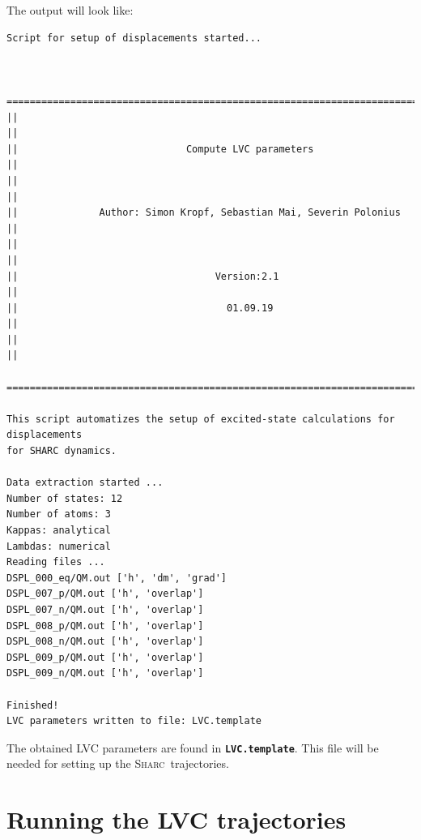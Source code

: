 \documentclass[a4paper,11pt,DIV=15,openany]{scrbook}
\makeatletter
\newcommand{\refermanual}[2][rectangle,draw=B,thick,fill=black!5,inner sep=1pt,outer sep=0pt,rounded corners]{\marginpar{\tikz[baseline=(current bounding box.north)]\node at (0,0) [#1]{\begin{tabular}{@{}l@{}}See\\ section\\ \ref*{#2}\\ (p. \pageref*{#2})\\ in the\\ manual.\end{tabular}};}}
\newcommand{\sharc}{\textsc{Sharc}}
\newcommand{\ttt}[1]{\textbf{\texttt{#1}}}
\makeatother
\begin{document}
The output will look like:
\begin{oframed}
\footnotesize\begin{Verbatim}[commandchars=\\\{\}]
  Script for setup of displacements started...


  ================================================================================
||                                                                                ||
||                             Compute LVC parameters                             ||
||                                                                                ||
||              Author: Simon Kropf, Sebastian Mai, Severin Polonius              ||
||                                                                                ||
||                                  Version:2.1                                   ||
||                                    01.09.19                                    ||
||                                                                                ||
  ================================================================================

This script automatizes the setup of excited-state calculations for displacements
for SHARC dynamics.

Data extraction started ...
Number of states: 12
Number of atoms: 3
Kappas: analytical
Lambdas: numerical
Reading files ...
DSPL_000_eq/QM.out ['h', 'dm', 'grad']
DSPL_007_p/QM.out ['h', 'overlap']
DSPL_007_n/QM.out ['h', 'overlap']
DSPL_008_p/QM.out ['h', 'overlap']
DSPL_008_n/QM.out ['h', 'overlap']
DSPL_009_p/QM.out ['h', 'overlap']
DSPL_009_n/QM.out ['h', 'overlap']

Finished!
LVC parameters written to file: LVC.template
\end{Verbatim}
\end{oframed}

\normalsize
The obtained LVC parameters are found in \ttt{LVC.template}.
This file will be needed for setting up the \sharc\ trajectories.





\clearpage
\section{Running the LVC trajectories}
\label{sec:run_LVC}
\end{document}
